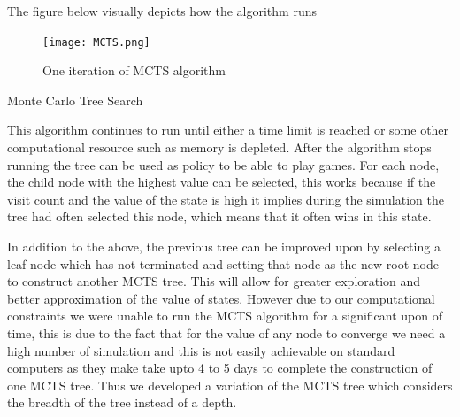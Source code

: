 \documentclass[a4paper,12pt,table]{article}
\begin{document}
The figure below visually depicts how the algorithm runs \par

\begin{figure}[h!]
    \begin{center}
        \texttt{[image: MCTS.png]}
        \caption{One iteration of MCTS algorithm \cite{Reinforcement learning: An introduction}}
        \label{fig:}
    \end{center}
\end{figure}

\begin{algorithm}[H]
    \SetAlgoLined
    \caption{Monte Carlo Tree Search}
\end{algorithm}

This algorithm continues to run until either a time limit is reached or some other computational resource such as memory is depleted. After the algorithm stops running the tree can be used as policy to be able to play games. For each node, the child node with the highest value can be selected, this works because if the visit count and the value of the state is high it implies during the simulation the tree had often selected this node, which means that it often wins in this state. \par

In addition to the above, the previous tree can be improved upon by selecting a leaf node which has not terminated and setting that node as the new root node to construct another MCTS tree. This will allow for greater exploration and better approximation of the value of states. However due to our computational constraints we were unable to run the MCTS algorithm for a significant upon of time, this is due to the fact that for the value of any node to converge we need a high number of simulation and this is not easily achievable on standard computers as they make take upto 4 to 5 days to complete the construction of one MCTS tree. Thus we developed a variation of the MCTS tree which considers the breadth of the tree instead of a depth. \par
\end{document}
